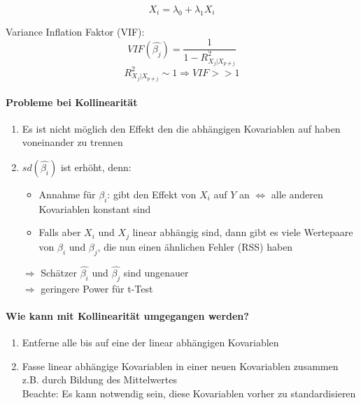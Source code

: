 \[ X_i = \lambda_0 + \lambda_1 X_i \]

Variance Inflation Faktor (VIF):
\[ VIF(\hat{\beta_j})= \frac{1}{1- R_{X_j|X_{p \neq j}}^{2}} \]
\[ R_{X_j|X_{p \neq j}}^{2} \sim 1 \Rightarrow VIF >> 1 \]

\paragraph{Probleme bei Kollinearität}
\begin{enumerate}
	\item Es ist nicht möglich den Effekt den die abhängigen Kovariablen auf  haben voneinander zu trennen
	\item $sd(\hat{\beta_i})$ ist erhöht, denn: 
		\begin{itemize}
			\item Annahme für $\beta_i$: gibt den Effekt von $X_i$ auf $Y$ an $\Leftrightarrow$ alle anderen Kovariablen konstant sind
			\item Falls aber $X_i$ und $X_j$ linear abhängig sind, dann gibt es viele Wertepaare von $\beta_i$ und $\beta_j$, die nun einen ähnlichen Fehler (RSS) haben
		\end{itemize}
		$\Rightarrow$ Schätzer $\hat{\beta_i}$ und $\hat{\beta_j}$ sind ungenauer \\
		$\Rightarrow$ geringere Power für t-Test
\end{enumerate}

\paragraph{Wie kann mit Kollinearität umgegangen werden?}
\begin{enumerate}
	\item Entferne alle bis auf eine der linear abhängigen Kovariablen
	\item Fasse linear abhängige Kovariablen in einer neuen Kovariablen zusammen z.B. durch Bildung des Mittelwertes \\
		Beachte: Es kann notwendig sein, diese Kovariablen vorher zu standardisieren
\end{enumerate}

